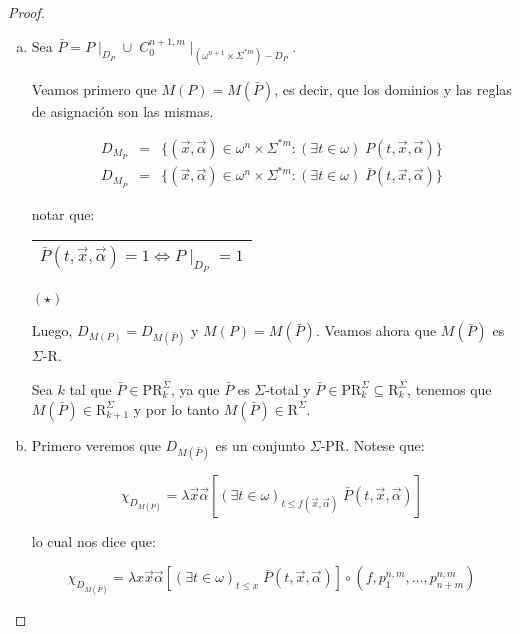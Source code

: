   \begin{proof}
    \begin{enumerate}[a)]
      \item Sea $\bar{P} = P \mid_{D_{P}} \cup \; C_{0}^{n+1,m} \mid_{(\omega^{n+1} \times \Sigma^{\ast m})-D_{P}}$.

        \PN Veamos primero que $M(P) = M(\bar{P})$, es decir, que los dominios y las reglas de asignación son las
        mismas.

        \begin{eqnarray}
          \nonumber D_{M_{P}} &=& \{(\vec{x},\vec{\alpha}) \in \omega^{n} \times \Sigma^{\ast m}: (\exists t \in \omega)
            \; P(t,\vec{x},\vec{\alpha})\} \\
          \nonumber D_{M_{\bar{P}}} &=& \{(\vec{x},\vec{\alpha}) \in \omega^{n} \times \Sigma^{\ast m}: (\exists t \in
            \omega) \; \bar{P}(t,\vec{x},\vec{\alpha})\}
        \end{eqnarray}

        \PN notar que:

        \begin{center} \begin{tabular}{|c|} \hline $\bar{P}(t,\vec{x},\vec{\alpha}) = 1 \Leftrightarrow P \mid_{D_{P}} =
        1$ \\\hline \end{tabular} $(\star)$ \end{center}

        \PN Luego, $D_{M(P)} = D_{M(\bar{P})}$ y $M(P) = M(\bar{P})$. Veamos ahora que $M(\bar{P})$ es $\Sigma$-R.

        \PN Sea $k$ tal que $\bar{P} \in \mathrm{PR}_{k}^{\Sigma}$, ya que $\bar{P}$ es $\Sigma$-total y $\bar{P} \in
        \mathrm{PR}_{k}^{\Sigma} \subseteq \mathrm{R}_{k}^{\Sigma}$, tenemos que $M(\bar{P}) \in
        \mathrm{R}_{k+1}^{\Sigma}$ y por lo tanto $M(\bar{P}) \in \mathrm{R}^{\Sigma}$.

      \item Primero veremos que $D_{M(\bar{P})}$ es un conjunto $\Sigma$-PR. Notese que:

        \[
          \chi_{D_{M(\bar{P})}} = \lambda \vec{x}\vec{\alpha} \left[(\exists t \in \omega)_{t \leq
          f(\vec{x},\vec{\alpha})} \; \bar{P}(t,\vec{x},\vec{\alpha})\right]
        \]

        \PN lo cual nos dice que:

        \[
          \chi_{D_{M(\bar{P})}} = \lambda x\vec{x}\vec{\alpha} \left[(\exists t \in \omega)_{t\leq x} \;
          \bar{P}(t,\vec{x},\vec{\alpha})\right] \circ (f,p_{1}^{n,m},\dotsc,p_{n+m}^{n,m})
        \]


\end{enumerate}
\end{proof}

